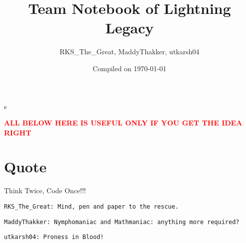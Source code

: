 \documentclass[landscape, 8pt, a4paper, oneside,  twocolumn]{extarticle}
\title{Team Notebook of Lightning Legacy}
\author{RKS\_The\_Great, MaddyThakker, utkarsh04}
\date{Compiled on \today}
\begin{document}
{
	\Large
	
	\maketitle
	
\tableofcontents
}
\thispagestyle{fancy}
s
\pagebreak


 \textcolor{red}{\textbf{ALL BELOW HERE IS USEFUL ONLY IF YOU GET THE IDEA RIGHT}}
	
\section{Quote}
Think Twice, Code Once!!!

\begin{verbatim}
RKS_The_Great: Mind, pen and paper to the rescue.
\end{verbatim}

\begin{verbatim}
MaddyThakker: Nymphomaniac and Mathmaniac: anything more required?
\end{verbatim}

\begin{verbatim}
utkarsh04: Proness in Blood!
\end{verbatim}
\end{document}
